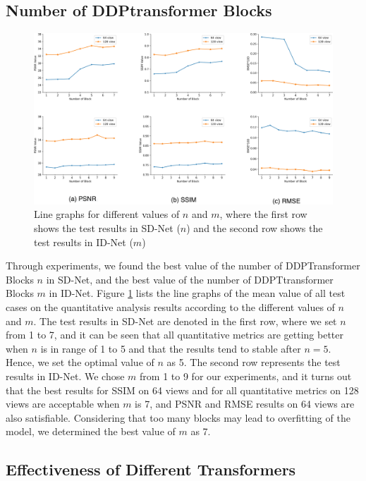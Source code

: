 \documentclass[lettersize,journal]{IEEEtran}
\begin{document}
\subsection{Number of DDPtransformer Blocks}
\begin{figure}[!t]
	\centering
	\includegraphics[width=6.5in]{12.eps}
	\caption{Line graphs for different values of $n$ and $m$, where the first row shows the test results in SD-Net ($n$) and the second row shows the test results in ID-Net ($m$)}
	\label{fig12}
\end{figure}

Through experiments, we found the best value of the number of DDPTransformer Blocks $n$ in SD-Net, and the best value of the number of DDPTtransformer Blocks $m$ in ID-Net. Figure \ref{fig12} lists the line graphs of the mean value of all test cases on the quantitative analysis results according to the different values of $n$ and $m$. The test results in SD-Net are denoted in the first row, where we set $n$ from 1 to 7, and it can be seen that all quantitative metrics are getting better when $n$ is in range of 1 to 5 and that the results tend to stable after $n=5$. Hence, we set the optimal value of $n$ as 5. The second row represents the test results in ID-Net. We chose $m$ from 1 to 9 for our experiments, and it turns out that the best results for SSIM on 64 views and for all quantitative metrics on 128 views are acceptable when $m$ is 7, and PSNR and RMSE results on 64 views are also satisfiable. Considering that too many blocks may lead to overfitting of the model, we determined the best value of $m$ as 7.

\subsection{Effectiveness of Different Transformers}
\end{document}
